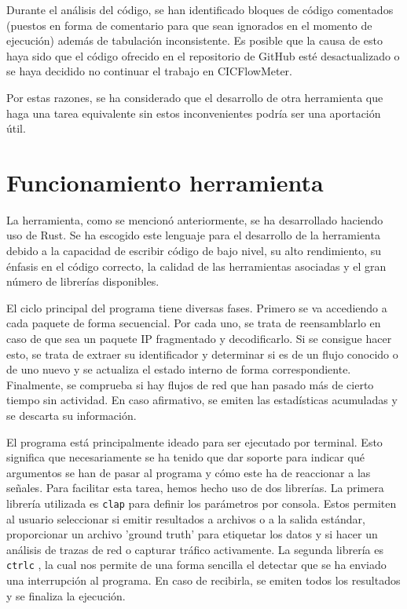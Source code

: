 \documentclass[10pt,a4paper,twoside]{article}
\begin{document}
\begin{multicols}{2}
    Durante el análisis del código, se han identificado bloques de código comentados (puestos en forma de comentario para que sean ignorados en el momento de ejecución) además de tabulación inconsistente. Es posible que la causa de esto haya sido que el código ofrecido en el repositorio de GitHub esté desactualizado o se haya decidido no continuar el trabajo en CICFlowMeter.

    Por estas razones, se ha considerado que el desarrollo de otra herramienta que haga una tarea equivalente sin estos inconvenientes podría ser una aportación útil.

    \section{Funcionamiento herramienta} \label{funcherramienta}

    La herramienta, como se mencionó anteriormente, se ha desarrollado haciendo uso de Rust. Se ha escogido este lenguaje para el desarrollo de la herramienta debido a la capacidad de escribir código de bajo nivel, su alto rendimiento, su énfasis en el código correcto, la calidad de las herramientas asociadas y el gran número de librerías disponibles.

    El ciclo principal del programa tiene diversas fases. Primero se va accediendo a cada paquete de forma secuencial. Por cada uno, se trata de reensamblarlo en caso de que sea un paquete IP fragmentado y decodificarlo. Si se consigue hacer esto, se trata de extraer su identificador y determinar si es de un flujo conocido o de uno nuevo y se actualiza el estado interno de forma correspondiente. Finalmente, se comprueba si hay flujos de red que han pasado más de cierto tiempo sin actividad. En caso afirmativo, se emiten las estadísticas acumuladas y se descarta su información.

    El programa está principalmente ideado para ser ejecutado por terminal. Esto significa que necesariamente se ha tenido que dar soporte para indicar qué argumentos se han de pasar al programa y cómo este ha de reaccionar a las señales. Para facilitar esta tarea, hemos hecho uso de dos librerías. La primera librería utilizada es \texttt{clap} \cite{Knapp_clap_2024} para definir los parámetros por consola. Estos permiten al usuario seleccionar si emitir resultados a archivos o a la salida estándar, proporcionar un archivo 'ground truth' para etiquetar los datos y si hacer un análisis de trazas de red o capturar tráfico activamente. La segunda librería es \texttt{ctrlc} \cite{controlc}, la cual nos permite de una forma sencilla el detectar que se ha enviado una interrupción al programa. En caso de recibirla, se emiten todos los resultados y se finaliza la ejecución.


\end{multicols}
\end{document}
